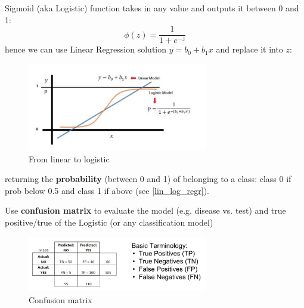 \documentclass[11pt]{article}
\begin{document}
Sigmoid (aka Logistic) function takes in any value and outputs it between 0 and 1:
\[ \phi(z) = \frac{1}{1+e^{-z}}
\]
hence we can use Linear Regression solution $y=b_0+b_1 x$ and replace it into $z$: 
\begin{figure}[htbp] 
	\centering
	\includegraphics[width=0.7\textwidth]{pics/sigmoid}
	\caption{From linear to logistic}  
	\label{sigmoid}
\end{figure}

returning the \textbf{probability} (between 0 and 1) of belonging to a class: class 0 if prob below 0.5 and class 1 if above (see \ref{lin_log_regr}). 

Use \textbf{confusion matrix} to evaluate the model (e.g. disease vs. test) and true positive/true of the Logistic (or any classification model)
\begin{figure}[htbp] 
	\centering
	\includegraphics[width=0.7\textwidth]{pics/confusion_matrix}
	\caption{Confusion matrix}  
\end{figure}
\end{document}
